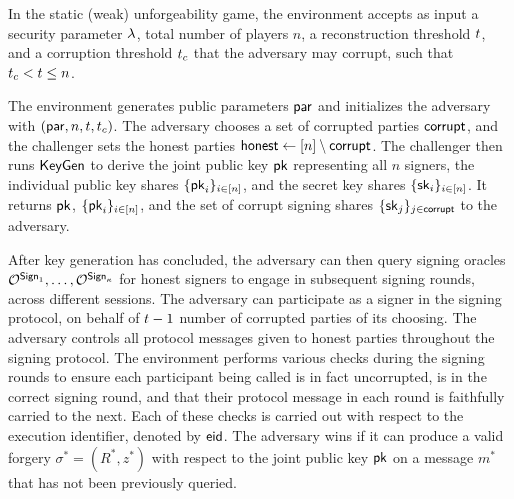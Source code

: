 In the static (weak) unforgeability game,
the environment accepts as input a security parameter $\lambda$,
total number of players $n$, a reconstruction threshold $t$,
and a corruption threshold $t_c$ that the adversary may corrupt,
such that $t_c < t \leq n$.

The environment generates public parameters $\mathsf{par}$
and initializes the adversary with $(\mathsf{par}, n, t, t_c)$.
The adversary chooses a set of corrupted parties $\mathsf{corrupt}$,
and the challenger sets the honest parties $\mathsf{honest} \gets [n] \setminus \mathsf{corrupt}$.
The challenger then runs $\mathsf{KeyGen}$ to derive the joint public key $\mathsf{pk}$ representing all $n$ signers, the individual public key shares $\{ \mathsf{pk}_i \}_{i \in [n]}$, and the secret key shares $ \{ \mathsf{sk}_i \}_{i \in [n]}$.
It returns $\mathsf{pk}$, $\{ \mathsf{pk}_i \}_{i \in [n]}$, and the set of corrupt signing shares $ \{ \mathsf{sk}_j \}_{j \in \mathsf{corrupt}}$ to the adversary.


After key generation has concluded,
the adversary can then query signing oracles $\mathcal{O}^{\mathsf{Sign}_1}, \ldots, \mathcal{O}^{\mathsf{Sign}_\kappa}$ for honest signers to engage in subsequent signing rounds, across different sessions.
The adversary can participate as a signer in the signing protocol,
on behalf of $t-1$ number of corrupted parties of its choosing.
The adversary controls all protocol messages given to honest parties throughout the signing protocol.
The environment performs various checks during the signing rounds to ensure each participant being called is in fact uncorrupted,
is in the correct signing round,
and that their protocol message in each round is faithfully carried to the next.
Each of these checks is carried out with respect to the execution identifier, denoted by $\mathsf{eid}$.
%
The adversary wins if it can produce a valid forgery $\sigma^* = (R^*, z^*)$ with
respect to the joint public key $\mathsf{pk}$ on a message $m^*$ that has not been previously queried.

